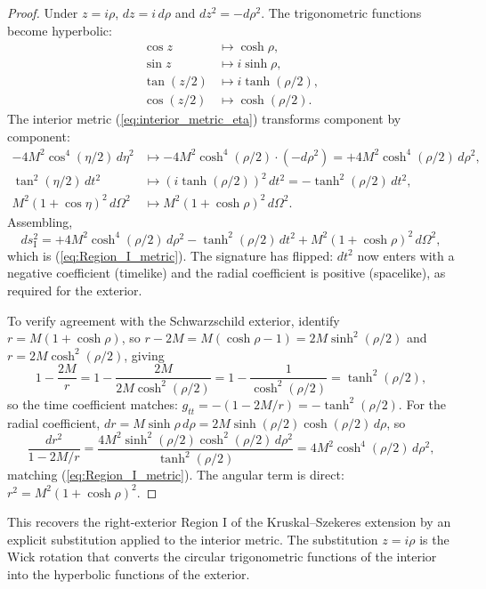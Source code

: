 \documentclass[11pt,a4paper]{article}
\theoremstyle{definition}
\begin{document}
\begin{proof}
Under $z = i\rho$, $dz = i\, d\rho$ and $dz^2 = -d\rho^2$. The trigonometric functions become hyperbolic:
\begin{align}
\cos z &\mapsto \cosh\rho, \\
\sin z &\mapsto i\sinh\rho, \\
\tan(z/2) &\mapsto i\tanh(\rho/2), \\
\cos(z/2) &\mapsto \cosh(\rho/2).
\end{align}
The interior metric (\ref{eq:interior_metric_eta}) transforms component by component:
\begin{align}
-4M^2 \cos^4(\eta/2)\, d\eta^2 &\mapsto -4M^2 \cosh^4(\rho/2) \cdot (-d\rho^2) = +4M^2\cosh^4(\rho/2)\, d\rho^2, \\
\tan^2(\eta/2)\, dt^2 &\mapsto (i\tanh(\rho/2))^2\, dt^2 = -\tanh^2(\rho/2)\, dt^2, \\
M^2(1+\cos\eta)^2\, d\Omega^2 &\mapsto M^2(1+\cosh\rho)^2\, d\Omega^2.
\end{align}
Assembling,
\begin{equation}
ds^2_{\text{I}} = +4M^2\cosh^4(\rho/2)\, d\rho^2 - \tanh^2(\rho/2)\, dt^2 + M^2(1+\cosh\rho)^2\, d\Omega^2,
\end{equation}
which is (\ref{eq:Region_I_metric}). The signature has flipped: $dt^2$ now enters with a negative coefficient (timelike) and the radial coefficient is positive (spacelike), as required for the exterior.

To verify agreement with the Schwarzschild exterior, identify $r = M(1+\cosh\rho)$, so $r - 2M = M(\cosh\rho - 1) = 2M\sinh^2(\rho/2)$ and $r = 2M\cosh^2(\rho/2)$, giving
\begin{equation}
1 - \frac{2M}{r} = 1 - \frac{2M}{2M\cosh^2(\rho/2)} = 1 - \frac{1}{\cosh^2(\rho/2)} = \tanh^2(\rho/2),
\end{equation}
so the time coefficient matches: $g_{tt} = -(1 - 2M/r) = -\tanh^2(\rho/2)$. For the radial coefficient, $dr = M\sinh\rho\, d\rho = 2M\sinh(\rho/2)\cosh(\rho/2)\, d\rho$, so
\begin{equation}
\frac{dr^2}{1 - 2M/r} = \frac{4M^2\sinh^2(\rho/2)\cosh^2(\rho/2)\, d\rho^2}{\tanh^2(\rho/2)} = 4M^2\cosh^4(\rho/2)\, d\rho^2,
\end{equation}
matching (\ref{eq:Region_I_metric}). The angular term is direct: $r^2 = M^2(1+\cosh\rho)^2$.
\end{proof}

This recovers the right-exterior Region I of the Kruskal--Szekeres extension by an explicit substitution applied to the interior metric. The substitution $z = i\rho$ is the Wick rotation that converts the circular trigonometric functions of the interior into the hyperbolic functions of the exterior.
\end{document}

